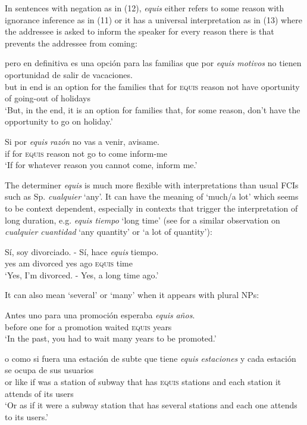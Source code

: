 \documentclass[output=paper
,modfonts
,nonflat]{langsci/langscibook}
\begin{document}
In sentences with negation as in (12), \textit{equis} either refers to some reason with ignorance inference as in (11) or it has a universal interpretation as in (13) where the addressee is asked to inform the speaker for every reason there is that prevents the addressee from coming:

\ea
\gll  pero en definitiva es una opción para las familias que por \textit{equis} \textit{motivos} no tienen oportunidad de salir de vacaciones.\\
but in end is an option for the families that for \textsc{equis} reason not have oportunity of going-out of holidays\\
\glt ‘But, in the end, it is an option for families that, for some reason, don’t have the opportunity to go on holiday.’
\z

\ea
\gll  Si por \textit{equis} \textit{razón} no vas a venir, avisame.\\
if for \textsc{equis} reason not go to come inform-me\\
\glt ‘If for whatever reason you cannot come, inform me.’
\z

The determiner \textit{equis} is much more flexible with interpretations than usual FCIs such as Sp. \textit{cualquier} ‘any’. It can have the meaning of ‘much/a lot’ which seems to be context dependent, especially in contexts that trigger the interpretation of long duration, e.g. \textit{equis tiempo} ‘long time’ (see \citealt{Rivero2011} for a similar observation on \textit{cualquier cuantidad} ‘any quantity’ or ‘a lot of quantity’):

\ea
\gll Sí, soy divorciado. - Sí, hace \textit{equis} tiempo.\\
yes am divorced {} yes ago \textsc{equis} time\\
\glt ‘Yes, I’m divorced. - Yes, a long time ago.’
\z

It can also mean ‘several’ or ‘many’ when it appears with plural NPs:

\ea
\gll  Antes uno para una promoción esperaba \textit{equis} \textit{años}.\\
before one for a promotion waited \textsc{equis} years\\
\glt ‘In the past, you had to wait many years to be promoted.’
\z

\ea
\gll  o como si fuera una estación de subte que tiene \textit{equis} \textit{estaciones} y cada estación se ocupa de sus usuarios\\
or like if was a station of subway that has \textsc{equis} stations and each station it attends of its users\\
\glt ‘Or as if it were a subway station that has several stations and each one attends to its users.’
\z
\end{document}
